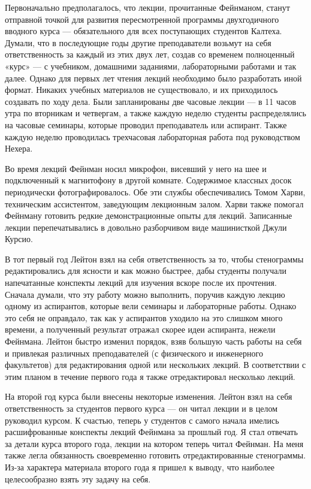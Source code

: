 \documentclass[10pt,oneside]{article}
\begin{document}
Первоначально предполагалось, что лекции, прочитанные Фейнманом, станут отправной точкой для развития пересмотренной программы двухгодичного вводного курса --- обязательного для всех поступающих студентов Калтеха. Думали, что в последующие годы другие преподаватели возьмут на себя ответственность за каждый из этих двух лет, создав со временем полноценный «курс» --- с учебником, домашними заданиями, лабораторными работами и так далее. Однако для первых лет чтения лекций необходимо было разработать иной формат. Никаких учебных материалов не существовало, и их приходилось создавать по ходу дела. Были запланированы две часовые лекции --- в 11 часов утра по вторникам и четвергам, а также каждую неделю студенты распределялись на часовые семинары, которые проводил преподаватель или аспирант. Также каждую неделю проводилась трехчасовая лабораторная работа под руководством Нехера.\par

Во время лекций Фейнман носил микрофон, висевший у него на шее и подключенный к магнитофону в другой комнате. Содержимое классных досок периодически фотографировалось. Обе эти службы обеспечивались Томом Харви, техническим ассистентом, заведующим лекционным залом. Харви также помогал Фейнману готовить редкие демонстрационные опыты для лекций. Записанные лекции перепечатывались в довольно разборчивом виде машинисткой Джули Курсио.\par

В тот первый год Лейтон взял на себя ответственность за то, чтобы стенограммы редактировались для ясности и как можно быстрее, дабы студенты получали напечатанные конспекты лекций для изучения вскоре после их прочтения. Сначала думали, что эту работу можно выполнить, поручив каждую лекцию одному из аспирантов, которые вели семинары и лабораторные работы. Однако это себя не оправдало, так как у аспирантов уходило на это слишком много времени, а полученный результат отражал скорее идеи аспиранта, нежели Фейнмана. Лейтон быстро изменил порядок, взяв большую часть работы на себя и привлекая различных преподавателей (с физического и инженерного факультетов) для редактирования одной или нескольких лекций. В соответствии с этим планом в течение первого года я также отредактировал несколько лекций.\par

На второй год курса были внесены некоторые изменения. Лейтон взял на себя ответственность за студентов первого курса --- он читал лекции и в целом руководил курсом. К счастью, теперь у студентов с самого начала имелись расшифрованные конспекты лекций Фейнмана за прошлый год. Я стал отвечать за детали курса второго года, лекции на котором теперь читал Фейнман. На меня также легла обязанность своевременно готовить отредактированные стенограммы. Из-за характера материала второго года я пришел к выводу, что наиболее целесообразно взять эту задачу на себя.\par
\end{document}
